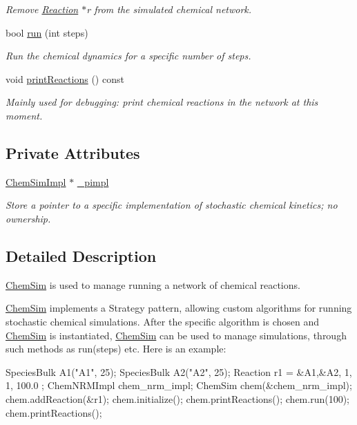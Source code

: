 \begin{DoxyCompactItemize}
\begin{DoxyCompactList}\small\item\em Remove \hyperlink{classchem_1_1Reaction}{Reaction} $\ast$r from the simulated chemical network. \end{DoxyCompactList}\item 
bool \hyperlink{classchem_1_1ChemSim_a1cc6ec051c2f0124bfa327816443b24b}{run} (int steps)
\begin{DoxyCompactList}\small\item\em Run the chemical dynamics for a specific number of steps. \end{DoxyCompactList}\item 
void \hyperlink{classchem_1_1ChemSim_a95687a56c1c6197aa7513638b8ace4da}{print\-Reactions} () const 
\begin{DoxyCompactList}\small\item\em Mainly used for debugging\-: print chemical reactions in the network at this moment. \end{DoxyCompactList}\end{DoxyCompactItemize}
\subsection*{Private Attributes}
\begin{DoxyCompactItemize}
\item 
\hyperlink{classchem_1_1ChemSimImpl}{Chem\-Sim\-Impl} $\ast$ \hyperlink{classchem_1_1ChemSim_a1e7c8136d1599176ecd517dfd419930a}{\-\_\-pimpl}
\begin{DoxyCompactList}\small\item\em Store a pointer to a specific implementation of stochastic chemical kinetics; no ownership. \end{DoxyCompactList}\end{DoxyCompactItemize}


\subsection{Detailed Description}
\hyperlink{classchem_1_1ChemSim}{Chem\-Sim} is used to manage running a network of chemical reactions. 

\hyperlink{classchem_1_1ChemSim}{Chem\-Sim} implements a Strategy pattern, allowing custom algorithms for running stochastic chemical simulations. After the specific algorithm is chosen and \hyperlink{classchem_1_1ChemSim}{Chem\-Sim} is instantiated, \hyperlink{classchem_1_1ChemSim}{Chem\-Sim} can be used to manage simulations, through such methods as run(steps) etc. Here is an example\-: 
\begin{DoxyCode}
        SpeciesBulk A1("A1",  25);
        SpeciesBulk A2("A2", 25);
        Reaction r1 = { {&A1,&A2}, 1, 1, 100.0 };
        ChemNRMImpl chem_nrm_impl;
        ChemSim chem(&chem_nrm_impl);
        chem.addReaction(&r1);
        chem.initialize();
        chem.printReactions();
        chem.run(100);   
        chem.printReactions();
\end{DoxyCode}
 

